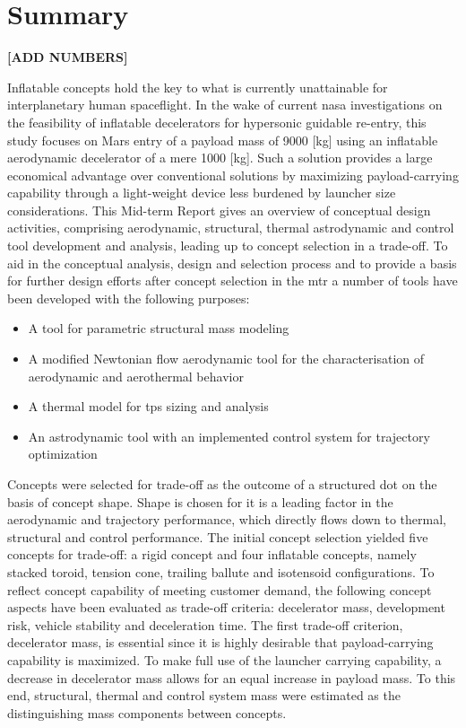 \section*{Summary}\label{cha:summary}

\textbf{[ADD NUMBERS]}

Inflatable concepts hold the key to what is currently unattainable for interplanetary human spaceflight. In the wake of current \acrfull{nasa} investigations on the feasibility of inflatable decelerators for hypersonic guidable re-entry, this study focuses on Mars entry of a payload mass of 9000 [kg] using an inflatable aerodynamic decelerator of a mere 1000 [kg]. Such a solution provides a large economical advantage over conventional solutions by maximizing payload-carrying capability through a light-weight device less burdened by launcher size considerations. This Mid-term Report gives an overview of conceptual design activities, comprising aerodynamic, structural, thermal astrodynamic and control tool development and analysis, leading up to concept selection in a trade-off.
\newline
\newline
To aid in the conceptual analysis, design and selection process and to provide a basis for further design efforts after concept selection in the \acrfull{mtr} a number of tools have been developed with the following purposes:
\begin{itemize}
\item A tool for parametric structural mass modeling
\item A modified Newtonian flow aerodynamic tool for the characterisation of aerodynamic and aerothermal behavior
\item A thermal model for \acrfull{tps} sizing and analysis
\item An astrodynamic tool with an implemented control system for trajectory optimization 
\end{itemize}

Concepts were selected for trade-off as the outcome of a structured \acrfull{dot} on the basis of concept shape. Shape is chosen for it is a leading factor in the aerodynamic and trajectory performance, which directly flows down to thermal, structural and control performance. The initial concept selection yielded five concepts for trade-off: a rigid concept and four inflatable concepts, namely stacked toroid, tension cone, trailing ballute and isotensoid configurations. To reflect concept capability of meeting customer demand, the following concept aspects have been evaluated as trade-off criteria: decelerator mass, development risk, vehicle stability and deceleration time.
\newline
\newline
The first trade-off criterion, decelerator mass, is essential since it is highly desirable that payload-carrying capability is maximized. To make full use of the launcher carrying capability, a decrease in decelerator mass allows for an equal increase in payload mass. To this end, structural, thermal and control system mass were estimated as the distinguishing mass components between concepts. 

